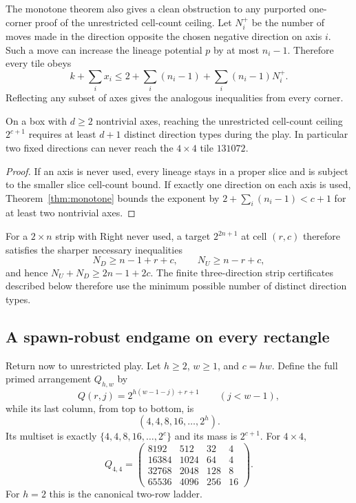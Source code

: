 The monotone theorem also gives a clean obstruction to any purported
one-corner proof of the unrestricted cell-count ceiling.  Let $N_i^+$ be
the number of moves made in the direction opposite the chosen negative
direction on axis $i$.  Such a move can increase the lineage potential
$p$ by at most $n_i-1$.  Therefore every tile obeys
\[
 k+\sum_i x_i\le
 2+\sum_i(n_i-1)+\sum_i(n_i-1)N_i^+.
\]
Reflecting any subset of axes gives the analogous inequalities from every
corner.

\begin{corollary}\label{cor:directions}
On a box with $d\ge2$ nontrivial axes, reaching the unrestricted
cell-count ceiling $2^{c+1}$ requires at least $d+1$ distinct direction
types during the play.  In particular two fixed directions can never
reach the $4\times4$ tile $131072$.
\end{corollary}
\begin{proof}
If an axis is never used, every lineage stays in a proper slice and is
subject to the smaller slice cell-count bound.  If exactly one direction
on each axis is used, Theorem~\ref{thm:monotone} bounds the exponent by
$2+\sum_i(n_i-1)<c+1$ for at least two nontrivial axes.
\end{proof}

For a $2\times n$ strip with Right never used, a target $2^{2n+1}$ at
cell $(r,c)$ therefore satisfies the sharper necessary inequalities
\[
 N_D\ge n-1+r+c,\qquad N_U\ge n-r+c,
\]
and hence $N_U+N_D\ge2n-1+2c$.  The finite three-direction strip
certificates described below therefore use the minimum possible number
of distinct direction types.

\subsection{A spawn-robust endgame on every rectangle}

Return now to unrestricted play.  Let $h\ge2$, $w\ge1$, and $c=hw$.
Define the full primed arrangement $Q_{h,w}$ by
\[
 Q(r,j)=2^{h(w-1-j)+r+1}\qquad(j<w-1),
\]
while its last column, from top to bottom, is
\[
 (4,4,8,16,\ldots,2^h).
\]
Its multiset is exactly $\{4,4,8,16,\ldots,2^c\}$ and its mass is
$2^{c+1}$.  For $4\times4$,
\[
 Q_{4,4}=\begin{pmatrix}
8192&512&32&4\\
16384&1024&64&4\\
32768&2048&128&8\\
65536&4096&256&16
\end{pmatrix}.
\]
For $h=2$ this is the canonical two-row ladder.

